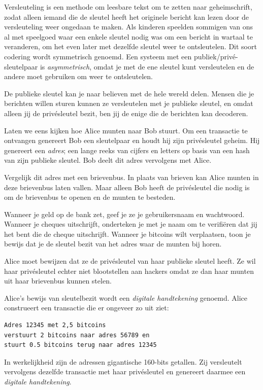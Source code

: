 Versleuteling is een methode om leesbare tekst om te zetten naar geheimschrift, zodat alleen iemand die de sleutel heeft het originele bericht kan lezen door de versleuteling weer ongedaan te maken. Als kinderen speelden sommigen van ons al met speelgoed waar een enkele sleutel nodig was om een bericht in wartaal te veranderen, om het even later met dezelfde sleutel weer te ontsleutelen. Dit soort codering wordt symmetrisch genoemd. Een systeem met een publiek/privé-sleutelpaar is \textit{asymmetrisch}, omdat je met de ene sleutel kunt versleutelen en de andere moet gebruiken om weer te ontsleutelen.

De publieke sleutel kan je naar believen met de hele wereld delen. Mensen die je berichten willen sturen kunnen ze versleutelen met je publieke sleutel, en omdat alleen jij de privésleutel bezit, ben jij de enige die de berichten kan decoderen.

Laten we eens kijken hoe Alice munten naar Bob stuurt. Om een transactie te ontvangen genereert Bob een sleutelpaar en houdt hij zijn privésleutel geheim. Hij genereert een \textit{adres}; een lange reeks van cijfers en letters op basis van een hash van zijn publieke sleutel. Bob deelt dit adres vervolgens met Alice.

Vergelijk dit adres met een brievenbus. In plaats van brieven kan Alice munten in deze brievenbus laten vallen. Maar alleen Bob heeft de privésleutel die nodig is om de brievenbus te openen en de munten te besteden.

Wanneer je geld op de bank zet, geef je ze je gebruikersnaam en wachtwoord. Wanneer je cheques uitschrijft, onderteken je met je naam om te verifiëren dat jij het bent die de cheque uitschrijft. Wanneer je bitcoins wilt verplaatsen, toon je bewijs dat je de sleutel bezit van het adres waar de munten bij horen.

Alice moet bewijzen dat ze de privésleutel van haar publieke sleutel heeft. Ze wil haar privésleutel echter niet blootstellen aan hackers omdat ze dan haar munten uit haar brievenbus kunnen stelen.

Alice's bewijs van sleutelbezit wordt een \textit{digitale handtekening} genoemd. Alice construeert een transactie die er ongeveer zo uit ziet:

\begin{verbatim}
Adres 12345 met 2,5 bitcoins 
verstuurt 2 bitcoins naar adres 56789 en 
stuurt 0.5 bitcoins terug naar adres 12345
\end{verbatim}

In werkelijkheid zijn de adressen gigantische 160-bits getallen. Zij versleutelt vervolgens dezelfde transactie met haar privésleutel en genereert daarmee een \textit{digitale handtekening}.

